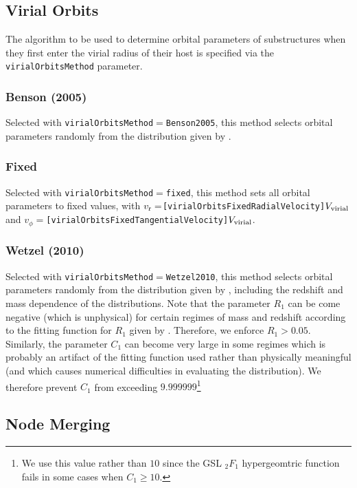 \subsection{Virial Orbits}

The algorithm to be used to determine orbital parameters of substructures when they first enter the virial radius of their host is specified via the {\tt virialOrbitsMethod} parameter.

\subsubsection{Benson (2005)}\label{sec:VirialOrbitsBenson2005}

Selected with {\tt virialOrbitsMethod}$=${\tt Benson2005}, this method selects orbital parameters randomly from the distribution given by \cite{benson_orbital_2005}.

\subsubsection{Fixed}

Selected with {\tt virialOrbitsMethod}$=${\tt fixed}, this method sets all orbital parameters to fixed values, with $v_{\rm r}=${\tt [virialOrbitsFixedRadialVelocity]}$V_{\rm virial}$ and  $v_\phi=${\tt [virialOrbitsFixedTangentialVelocity]}$V_{\rm virial}$.

\subsubsection{Wetzel (2010)}

Selected with {\tt virialOrbitsMethod}$=${\tt Wetzel2010}, this method selects orbital parameters randomly from the distribution given by \cite{wetzel_orbits_2010}, including the redshift and mass dependence of the distributions. Note that the parameter $R_1$ can be come negative (which is unphysical) for certain regimes of mass and redshift according to the fitting function for $R_1$ given by \cite{wetzel_orbits_2010}. Therefore, we enforce $R_1>0.05$. Similarly, the parameter $C_1$ can become very large in some regimes which is probably an artifact of the fitting function used rather than physically meaningful (and which causes numerical difficulties in evaluating the distribution). We therefore prevent $C_1$ from exceeding $9.999999$\footnote{We use this value rather than $10$ since the GSL $_2F_1$ hypergeomtric function fails in some cases when $C_1\ge 10$.}

\subsection{Node Merging}


